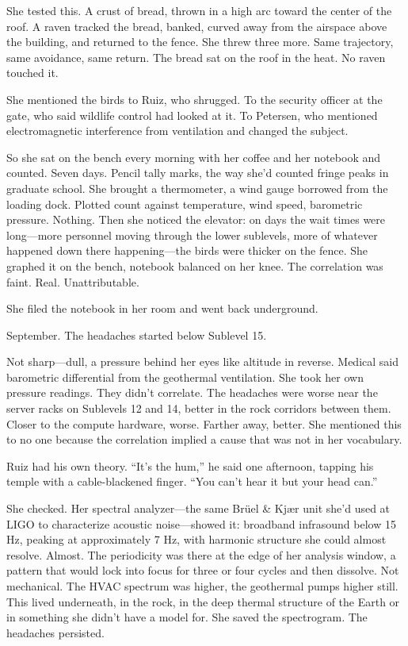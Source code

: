She tested this. A crust of bread, thrown in a high arc toward the center of the roof. A raven tracked the bread, banked, curved away from the airspace above the building, and returned to the fence. She threw three more. Same trajectory, same avoidance, same return. The bread sat on the roof in the heat. No raven touched it.

She mentioned the birds to Ruiz, who shrugged. To the security officer at the gate, who said wildlife control had looked at it. To Petersen, who mentioned electromagnetic interference from ventilation and changed the subject.

So she sat on the bench every morning with her coffee and her notebook and counted. Seven days. Pencil tally marks, the way she'd counted fringe peaks in graduate school. She brought a thermometer, a wind gauge borrowed from the loading dock. Plotted count against temperature, wind speed, barometric pressure. Nothing. Then she noticed the elevator: on days the wait times were long---more personnel moving through the lower sublevels, more of whatever happened down there happening---the birds were thicker on the fence. She graphed it on the bench, notebook balanced on her knee. The correlation was faint. Real. Unattributable.

She filed the notebook in her room and went back underground.

\scenebreak

September. The headaches started below Sublevel 15.

Not sharp---dull, a pressure behind her eyes like altitude in reverse. Medical said barometric differential from the geothermal ventilation. She took her own pressure readings. They didn't correlate. The headaches were worse near the server racks on Sublevels 12 and 14, better in the rock corridors between them. Closer to the compute hardware, worse. Farther away, better. She mentioned this to no one because the correlation implied a cause that was not in her vocabulary.

Ruiz had his own theory. ``It's the hum,'' he said one afternoon, tapping his temple with a cable-blackened finger. ``You can't hear it but your head can.''

She checked. Her spectral analyzer---the same Br\"{u}el \& Kj\ae r unit she'd used at LIGO to characterize acoustic noise---showed it: broadband infrasound below 15 Hz, peaking at approximately 7 Hz, with harmonic structure she could almost resolve. Almost. The periodicity was there at the edge of her analysis window, a pattern that would lock into focus for three or four cycles and then dissolve. Not mechanical. The HVAC spectrum was higher, the geothermal pumps higher still. This lived underneath, in the rock, in the deep thermal structure of the Earth or in something she didn't have a model for. She saved the spectrogram. The headaches persisted.

